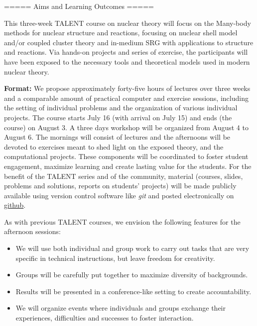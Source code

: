 \documentclass{beamer}
\begin{document}
\begin{frame}

===== Aims and Learning Outcomes ===== 
\begin{block}{}

This three-week TALENT course on nuclear theory will focus on the Many-body methods
for nuclear structure and reactions, focusing on nuclear shell model
and/or coupled cluster theory and in-medium SRG with applications to
structure and reactions.  Via hands-on projects and series of exercise, the participants 
will have been exposed to the necessary tools and theoretical models used in modern nuclear theory.


\noindent\textbf{Format:}
We propose approximately forty-five hours of lectures over three weeks and a
comparable amount of practical computer and exercise sessions, including the
setting of individual problems and the organization of various individual projects. The course starts July 16 (with arrival on July 15) and ends (the course) on August 3. A three days workshop will be organized from August 4 to August 6. 
The mornings will consist of lectures and the
afternoons will be devoted to exercises meant to shed light on the exposed theory, 
and the computational projects. These
components will be coordinated to foster student engagement,
maximize learning and create lasting value for the students. For the
benefit of the TALENT series and of the community, material (courses,
slides, problems and solutions, reports on students' projects) will be
made publicly available using version control software like \emph{git} and posted electronically on 
\href{{https://github.com}}{github}. 

As with previous TALENT courses, we envision
the following features for the afternoon sessions: 
\begin{itemize}
\item We will use both individual and group work to carry out tasks that are very specific in technical instructions, but leave freedom for creativity.  

\item Groups will be carefully put together to maximize diversity of backgrounds.  

\item Results will be presented in a conference-like setting to create accountability.  

\item We will organize events where individuals and groups exchange their experiences, difficulties and successes to foster interaction.  


\end{itemize}
\end{block}
\end{frame}
\end{document}
